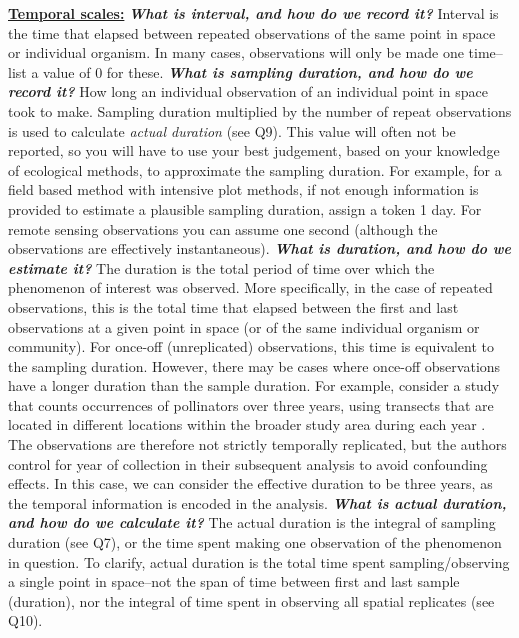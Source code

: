 \documentclass[12pt]{article}
\begin{document}
\begin{enumerate}
\hspace{-1cm}\underline{\textbf{Temporal scales:}}
\vspace{-0.5cm} 
   \Hitem \emph{\textbf{What is interval, and how do we record it?}} Interval is the time that elapsed between repeated observations of the same point in space or individual organism. In many cases, observations will only be made one time--list a value of 0 for these.  
  \Hitem \emph{\textbf{What is sampling duration, and how do we record it?}} How long an individual observation of an individual point in space took to make. Sampling duration multiplied by the number of repeat observations is used to calculate \emph{actual duration} (see Q9). This value will often not be reported, so you will have to use your best judgement, based on your knowledge of ecological methods, to approximate the sampling duration. For example, for a field based method with intensive plot methods, if not enough information is provided to estimate a plausible sampling duration, assign a token 1 day. For remote sensing observations you can assume one second (although the observations are effectively instantaneous).  
   \Hitem \emph{\textbf{What is duration, and how do we estimate it?}} The duration is the total period of time over which the phenomenon of interest was observed. More specifically, in the case of repeated observations, this is the total time that elapsed between the first and last observations at a given point in space (or of the same individual organism or community). For once-off (unreplicated) observations, this time is equivalent to the sampling duration. However, there may be cases where once-off observations have a longer duration than the sample duration. For example, consider a study that counts occurrences of pollinators over three years, using transects that are located in different locations within the broader study area during each year \cite{rollin_differences_2013}. The observations are therefore not strictly temporally replicated, but the authors control for year of collection in their subsequent analysis to avoid confounding effects.  In this case, we can consider the effective duration to be three years, as the temporal information is encoded in the analysis. 
  \Hitem \emph{\textbf{What is \emph{actual duration}, and how do we calculate it?}} The actual duration is the integral of sampling duration (see Q7), or the time spent making one observation of the phenomenon in question. To clarify, actual duration is the total time spent sampling/observing a single point in space--not the span of time between first and last sample (duration), nor the integral of time spent in observing all spatial replicates (see Q10). 

\end{enumerate}
\end{document}
